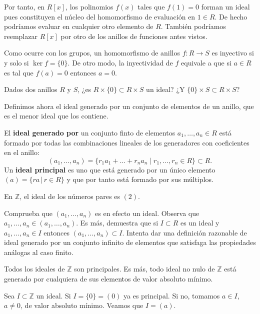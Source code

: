 
Por tanto, en \(R[x]\), los polinomios \(f(x)\) tales que \(f(1)=0\)
forman un ideal pues constituyen el núcleo del homomorfismo de
evaluación en \(1\in R\). De hecho podríamos evaluar en cualquier otro
elemento de \(R\). También podríamos reemplazar \(R[x]\) por otro de los
anillos de funciones antes vistos.


Como ocurre con los grupos, un homomorfismo de anillos
\(f\colon R\rightarrow S\) es inyectivo si y solo si \(\ker f=\{0\}\).
De otro modo, la inyectividad de \(f\) equivale a que si \(a\in R\) es
tal que \(f(a)=0\) entonces \(a=0\). 


Dados dos anillos \(R\) y \(S\), ¿es \(R\times\{0\}\subset R\times S\)
un ideal? ¿Y \(\{0\}\times S\subset R\times S\)? 

Definimos ahora el ideal generado por un conjunto de elementos de un
anillo, que es el menor ideal que los contiene.

\label{generators} El \textbf{ideal generado por} un
conjunto finto de elementos \(a_1,\dots,a_n\in R\) está formado por
todas las combinaciones lineales de los generadores con coeficientes en
el anillo:
\[(a_1,\dots,a_n)=\{r_1a_1+\dots+r_na_n\;|\; r_1,\dots,r_n\in R\}\subset R.\]
Un \textbf{ideal principal} es uno que está generado por un único
elemento \((a)=\{ra\,|\, r\in R\}\) y que por tanto está formado por
sus múltiplos. 

En \(\mathbb Z\), el ideal de los números pares es \((2)\).


Comprueba que \((a_1,\dots,a_n)\) es en efecto un ideal. Observa que
\(a_1,\dots,a_n\in (a_1,\dots, a_n)\). Es más, demuestra que si
\(I\subset R\) es un ideal y \(a_1,\dots,a_n\in I\) entonces
\((a_1,\dots,a_n)\subset I\). Intenta dar una definición razonable de
ideal generado por un conjunto infinito de elementos que satisfaga las
propiedades análogas al caso finito. 


Todos los ideales de \(\mathbb Z\) son principales. Es más, todo ideal
no nulo de \(\mathbb Z\) está generado por cualquiera de sus elementos
de valor absoluto mínimo. 


Sea \(I\subset \mathbb Z\) un ideal. Si \(I=\{0\}=(0)\) ya es
principal. Si no, tomamos \(a\in I\), \(a\neq 0\), de valor absoluto
mínimo. Veamos que \(I=(a)\).


